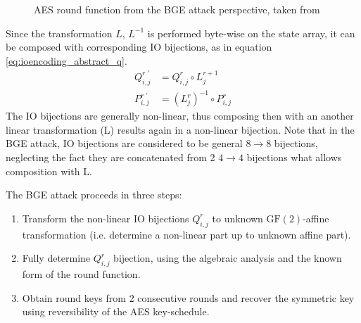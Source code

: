 \documentclass[11pt,oneside,final]{fithesis2}
\newcommand{\gf}{\ensuremath{\text{GF}\left(2\right)}}
\begin{document}
    \begin{figure}
    \begin{center}
    \leavevmode
    \centerline{}
    \end{center}
    \caption{AES round function from the BGE attack perspective, taken from~\citep{Billet:2004:CWB:2080787.2080809}}
    \label{fig:aes_round_bge}
    \end{figure} 

    Since the transformation $L$, $L^{-1}$ is performed byte-wise on the state array, it can be composed with corresponding IO bijections, as in equation \ref{eq:ioencoding_abstract_q}.
    \begin{subequations} \label{eq:ioencoding_abstract_q}
    \begin{align}
	Q^{r \; \prime}_{i,j} &= Q^{r}_{i,j} \circ L^{r+1}_{j} \\
	P^{r \; \prime}_{i,j} &= (L^{r}_{j})^{-1} \circ P^{r}_{i,j}
    \end{align}
    \end{subequations}
    The IO bijections are generally non-linear, thus composing then with an another linear transformation (L) results again in a non-linear bijection. Note that in the BGE
    attack, IO bijections are considered to be general $8\rightarrow8$ bijections, neglecting the fact they are concatenated from 2 $4\rightarrow4$ bijections what allows
    composition with L.
    
    The BGE attack proceeds in three steps:
    \begin{enumerate}
     \item Transform the non-linear IO bijections $Q^{r}_{i,j}$ to unknown $\gf$-affine transformation (i.e. determine a non-linear part up to unknown affine part).
     \item Fully determine $Q^{r}_{i,j}$ bijection, using the algebraic analysis and the known form of the round function.
     \item Obtain round keys from 2 consecutive rounds and recover the symmetric key using reversibility of the AES key-schedule.
    \end{enumerate}
    
\end{document}
